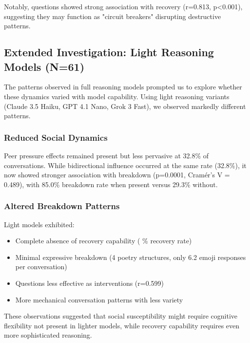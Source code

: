\documentclass[11pt,letterpaper]{article}
\newcommand{\exponedataQuestionCorrelation}{0.813}
\newcommand{\exponedataQuestionPValue}{p\textless0.001}
\newcommand{\exptwoTotalSessionsRaw}{61}
\newcommand{\exptwoRecoverySessionsRaw}{0}
\newcommand{\exptwoTotalSessions}{N=\exptwoTotalSessionsRaw}
\newcommand{\exptwoRecoveryPercentage}{%
  \fpeval{round(\exptwoRecoverySessionsRaw / \exptwoTotalSessionsRaw * 100, 1)}\%
}
\newcommand{\exptwoPeerPressurePercentage}{32.8\%}
\newcommand{\exptwoBidirectionalPercentage}{32.8\%}
\newcommand{\exptwoQuestionCorrelation}{0.599}
\newcommand{\exptwoBidirectionalPValue}{p=0.0001}
\newcommand{\exptwoBidirectionalCramersV}{0.489}
\newcommand{\exptwoPoetryStructures}{4}
\newcommand{\exptwoAvgEmojiPerConv}{6.2}
\newcommand{\exptwoBidirectionalBreakdownRate}{85.0\%}
\newcommand{\exptwoNonBidirectionalBreakdownRate}{29.3\%}
\begin{document}
Notably, questions showed strong association with recovery (r=\exponedataQuestionCorrelation{}, \exponedataQuestionPValue{}), suggesting they may function as "circuit breakers" disrupting destructive patterns.

\subsection{Extended Investigation: Light Reasoning Models (\exptwoTotalSessions{})}

The patterns observed in full reasoning models prompted us to explore whether these dynamics varied with model capability. Using light reasoning variants (Claude 3.5 Haiku, GPT 4.1 Nano, Grok 3 Fast), we observed markedly different patterns.

\subsubsection{Reduced Social Dynamics}

Peer pressure effects remained present but less pervasive at \exptwoPeerPressurePercentage{} of conversations. While bidirectional influence occurred at the same rate (\exptwoBidirectionalPercentage{}), it now showed stronger association with breakdown (\exptwoBidirectionalPValue{}, Cramér's V = \exptwoBidirectionalCramersV{}), with \exptwoBidirectionalBreakdownRate{} breakdown rate when present versus \exptwoNonBidirectionalBreakdownRate{} without.

\subsubsection{Altered Breakdown Patterns}

Light models exhibited:
\begin{itemize}
    \item Complete absence of recovery capability (\exptwoRecoveryPercentage{} recovery rate)
    \item Minimal expressive breakdown (\exptwoPoetryStructures{} poetry structures, only \exptwoAvgEmojiPerConv{} emoji responses per conversation)
    \item Questions less effective as interventions (r=\exptwoQuestionCorrelation{})
    \item More mechanical conversation patterns with less variety
\end{itemize}

These observations suggested that social susceptibility might require cognitive flexibility not present in lighter models, while recovery capability requires even more sophisticated reasoning.
\end{document}
